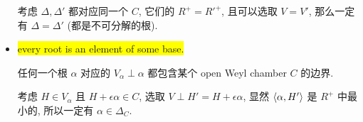 \begin{itemize}
\begin{tcolorbox}[title=proof:]
		考虑 $\Delta, \Delta'$ 都对应同一个 $C$, 它们的 $R^+ = R'^+$, 且可以选取 $V = V'$, 那么一定有 $\Delta = \Delta'$ (都是不可分解的根).
	\end{tcolorbox}
	
	\item \colorbox{yellow}{every root is an element of some base.}
	
	\begin{tcolorbox}[title=proof:]
		任何一个根 $\alpha$ 对应的 $V_\alpha \perp \alpha$ 都包含某个 open Weyl chamber $C$ 的边界.
		
		考虑 $H \in V_\alpha$ 且 $H + \epsilon \alpha \in C$, 选取 $V \perp H' = H + \epsilon \alpha$, 显然 $\braket{\alpha, H'}$ 是 $R^+$ 中最小的, 所以一定有 $\alpha \in \Delta_C$.
	\end{tcolorbox}
\end{itemize}

